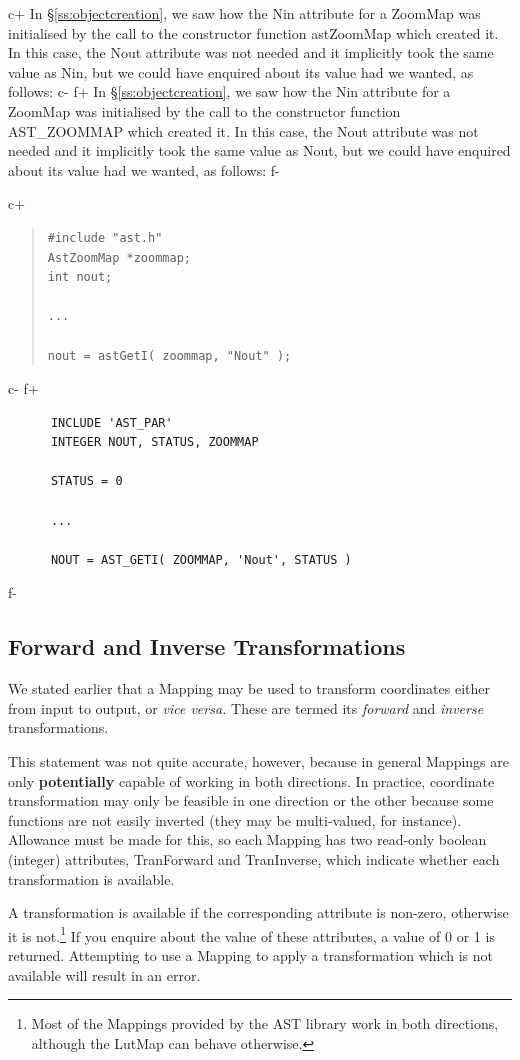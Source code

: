 \documentclass[twoside,11pt]{article}
\newcommand{\secref}[1]{\S\ref{#1}}
\newcommand{\secref}[1]{\ref{#1}}
\begin{document}
c+
In \secref{ss:objectcreation}, we saw how the Nin attribute for a
ZoomMap was initialised by the call to the constructor function
astZoomMap which created it. In this case, the Nout attribute was not
needed and it implicitly took the same value as Nin, but we could
have enquired about its value had we wanted, as follows:
c-
f+
In \secref{ss:objectcreation}, we saw how the Nin attribute for a
ZoomMap was initialised by the call to the constructor function
AST\_ZOOMMAP which created it. In this case, the Nout attribute was
not needed and it implicitly took the same value as Nout, but we could
have enquired about its value had we wanted, as follows:
f-

c+
\begin{quote}
\small
\begin{verbatim}
#include "ast.h"
AstZoomMap *zoommap;
int nout;

...

nout = astGetI( zoommap, "Nout" );
\end{verbatim}
\normalsize
\end{quote}
c-
f+
\small
\begin{verbatim}
      INCLUDE 'AST_PAR'
      INTEGER NOUT, STATUS, ZOOMMAP

      STATUS = 0

      ...

      NOUT = AST_GETI( ZOOMMAP, 'Nout', STATUS )
\end{verbatim}
\normalsize
f-

\subsection{Forward and Inverse Transformations}

We stated earlier that a Mapping may be used to transform coordinates
either from input to output, or {\em{vice versa.}} These are termed
its {\em{forward}} and {\em{inverse}} transformations.

This statement was not quite accurate, however, because in general
Mappings are only {\bf{potentially}} capable of working in both
directions. In practice, coordinate transformation may only be
feasible in one direction or the other because some functions are not
easily inverted (they may be multi-valued, for instance). Allowance
must be made for this, so each Mapping has two read-only boolean
(integer) attributes, TranForward and TranInverse, which indicate
whether each transformation is available.

A transformation is available if the corresponding attribute is
non-zero, otherwise it is not.\footnote{Most of the Mappings provided
by the AST library work in both directions, although the LutMap can
behave otherwise.} If you enquire about the value of these attributes,
a value of 0 or 1 is returned.  Attempting to use a Mapping to apply a
transformation which is not available will result in an error.
\end{document}
